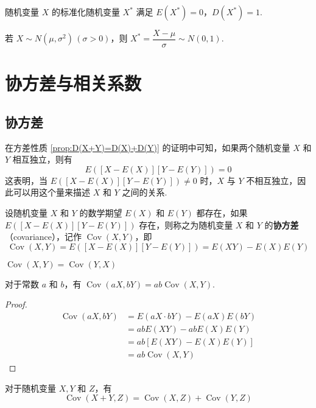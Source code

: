 随机变量 $X$ 的标准化随机变量 $X^*$ 满足 $E(X^*)=0$，$D(X^*)=1$.

\vspace{0.5em}

若 $X \sim N(\mu,\sigma^2) \, (\sigma > 0)$，则 $X^* = \dfrac{X-\mu}{\sigma} \sim N(0,1)$.

\section{协方差与相关系数}

\subsection{协方差}

在方差性质 \ref*{prop:D(X+Y)=D(X)+D(Y)} 的证明中可知，如果两个随机变量 $X$ 和 $Y$ 相互独立，则有
$$
E([X-E(X)][Y-E(Y)]) = 0
$$
这表明，当 $E([X-E(X)][Y-E(Y)]) \not= 0$ 时，$X$ 与 $Y$ 不相互独立，因此可以用这个量来描述 $X$ 和 $Y$ 之间的关系.

\begin{definition}
    设随机变量 $X$ 和 $Y$ 的数学期望 $E(X)$ 和 $E(Y)$ 都存在，如果 $E([X-E(X)][Y-E(Y)])$ 存在，则称之为随机变量 $X$ 和 $Y$ 的\textbf{协方差}（covariance），记作 $\operatorname{Cov}(X,Y)$，即
    $$
    \operatorname{Cov}(X,Y) = E([X-E(X)][Y-E(Y)]) = E(XY) - E(X) E(Y)
    $$
\end{definition}

\begin{property}
    $\operatorname{Cov}(X,Y) = \operatorname{Cov}(Y,X)$
\end{property}

\begin{property}
    对于常数 $a$ 和 $b$，有 $\operatorname{Cov}(aX,bY) = ab \operatorname{Cov}(X,Y)$.
\end{property}

\begin{proof}
    $$
    \begin{aligned}
        \operatorname{Cov}(aX,bY) &= E(aX \cdot bY) - E(aX) E(bY) \\
        &= ab E(XY) - ab E(X) E(Y) \\
        &= ab[E(XY) - E(X) E(Y)] \\
        &= ab \operatorname{Cov}(X,Y)
    \end{aligned}
    $$
\end{proof}

\begin{property}
    对于随机变量 $X,Y$ 和 $Z$，有
    $$
    \operatorname{Cov}(X+Y,Z) = \operatorname{Cov}(X,Z) + \operatorname{Cov}(Y,Z)
    $$
\end{property}


